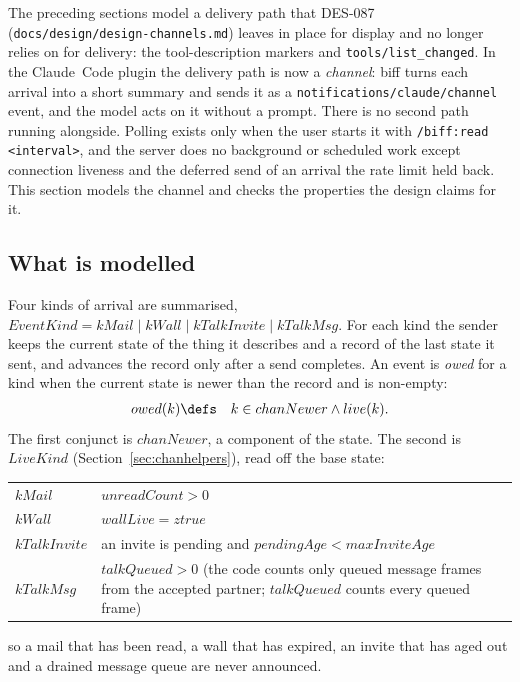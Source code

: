 \documentclass[a4paper,10pt,fleqn]{article}
\begin{document}
The preceding sections model a delivery path that DES-087
(\texttt{docs/design/design-channels.md}) leaves in place for display and no
longer relies on for delivery: the tool-description markers and
\texttt{tools/list\_changed}.  In the Claude~Code plugin the delivery path
is now a \emph{channel}: biff turns each arrival into a short summary and
sends it as a \texttt{notifications/claude/channel} event, and the model
acts on it without a prompt.  There is no second path running alongside.
Polling exists only when the user starts it with \texttt{/biff:read
<interval>}, and the server does no background or scheduled work except
connection liveness and the deferred send of an arrival the rate limit held
back.  This section models the channel and checks the properties the design
claims for it.

\subsection{What is modelled}

Four kinds of arrival are summarised, $EventKind = kMail \mid kWall \mid
kTalkInvite \mid kTalkMsg$.  For each kind the sender keeps the current
state of the thing it describes and a record of the last state it sent, and
advances the record only after a send completes.  An event is
\emph{owed} for a kind when the current state is newer than the record and
is non-empty:
\begin{eqnarray*}
  owed(k) & \defs & k \in chanNewer \land live(k).
\end{eqnarray*}
The first conjunct is $chanNewer$, a component of the state.  The second is
$LiveKind$ (Section~\ref{sec:chanhelpers}), read off the base state:
\begin{center}
\begin{tabular}{ll}
  $kMail$ & $unreadCount > 0$ \\
  $kWall$ & $wallLive = ztrue$ \\
  $kTalkInvite$ & an invite is pending and $pendingAge < maxInviteAge$ \\
  $kTalkMsg$ & $talkQueued > 0$ (the code counts only queued message frames
    from the accepted partner; $talkQueued$ counts every queued frame) \\
\end{tabular}
\end{center}
so a mail that has been read, a wall that has expired, an invite that has
aged out and a drained message queue are never announced.
\end{document}
